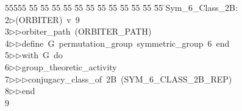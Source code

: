 %
%
\begin{tabbing}
55555 \= 55 \= 55 \= 55 \= 55 \= 55 \= 55 \= 55 \= 55 \= 55 \= 55 \= 55 \= 55 \= \>Sym\_6\_Class\_2B:\\[0pt]
2\>$\triangleright$\>(ORBITER)\ v\ 9\ \\[0pt]
3\>$\triangleright$\>$\triangleright$\>orbiter\_path\ (ORBITER\_PATH)\ \\[0pt]
4\>$\triangleright$\>$\triangleright$\>define\ G\ permutation\_group\ symmetric\_group\ 6\ end\ \\[0pt]
5\>$\triangleright$\>$\triangleright$\>with\ G\ do\ \\[0pt]
6\>$\triangleright$\>$\triangleright$\>group\_theoretic\_activity\ \\[0pt]
7\>$\triangleright$\>$\triangleright$\>$\triangleright$\>conjugacy\_class\_of\ 2B\ (SYM\_6\_CLASS\_2B\_REP)\ \\[0pt]
8\>$\triangleright$\>$\triangleright$\>end\\[0pt]
9\>\end{tabbing}
